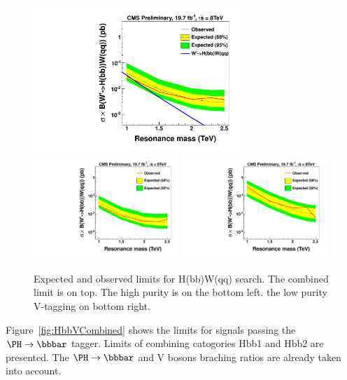 \begin{figure}[h!tpb]
\begin{center}
\includegraphics[width=0.70\textwidth]{HbbZqqfigs/Limits/brazilianFlag_Hbb_HbbWqqCombine.pdf}
\includegraphics[width=0.49\textwidth]{HbbZqqfigs/Limits/brazilianFlag_Hbb_HbbWqqHighP.pdf}
\includegraphics[width=0.49\textwidth]{HbbZqqfigs/Limits/brazilianFlag_Hbb_HbbWqqLowP.pdf}
\end{center}
\caption{Expected and observed limits for H(bb)W(qq) search. The combined limit is on top.
The high purity is on the bottom left. the low purity V-tagging on bottom right.
}
\label{fig:HbbWqqLimits}
\end{figure}

\fi

Figure~\ref{fig:HbbVCombined} shows the limits for \HbbVqq signals passing the 
$\Hbb$ tagger. Limits of combining catogories Hbb1 and Hbb2 are presented. 
The $\Hbb$ and V bosons braching ratios are already taken into account.


